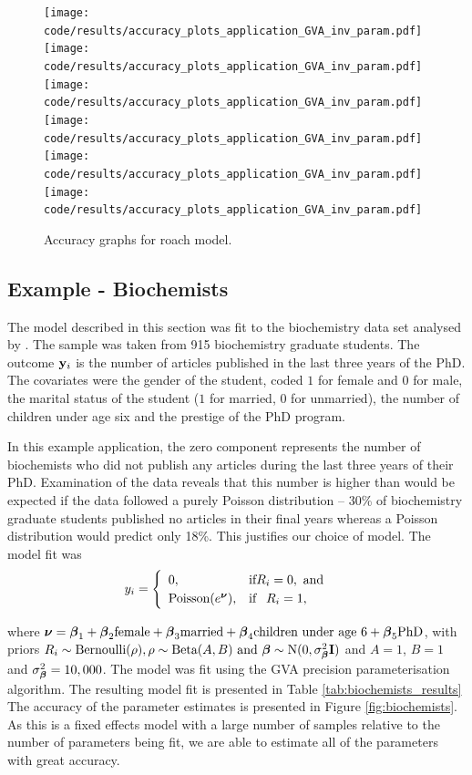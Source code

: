 \begin{figure}[h]
	\centering
	\texttt{[image: code/results/accuracy\_plots\_application\_GVA\_inv\_param.pdf]}
	\texttt{[image: code/results/accuracy\_plots\_application\_GVA\_inv\_param.pdf]}
	\texttt{[image: code/results/accuracy\_plots\_application\_GVA\_inv\_param.pdf]}
	\texttt{[image: code/results/accuracy\_plots\_application\_GVA\_inv\_param.pdf]}
	\texttt{[image: code/results/accuracy\_plots\_application\_GVA\_inv\_param.pdf]}
	\texttt{[image: code/results/accuracy\_plots\_application\_GVA\_inv\_param.pdf]}
	\caption{Accuracy graphs for roach model.}
	\label{fig:accuracy_roach}
\end{figure}
		
\subsection{Example - Biochemists}
\label{sec:biochemists}

The model described in this section was fit to the biochemistry data set
analysed by \cite{Long1990}. The sample was taken from 915 biochemistry
graduate students. The outcome ${\bf y}_i$ is the number of articles published in
the last three years of the PhD. The covariates were the gender of the student,
coded $1$ for female and $0$ for male, the marital status of the student ($1$
for married, $0$ for unmarried), the number of children under age six and the
prestige of the PhD program.

In this example application, the zero component represents the number of
biochemists who did not publish any articles during the last three years of
their PhD. Examination of the data reveals that this number is higher than
would be expected if the data followed a purely Poisson distribution -- 30\% of
biochemistry graduate students published no articles in their final years
whereas a Poisson distribution would predict only 18\%. This justifies our
choice of model. The model fit was
$$
	y_i = \begin{cases}
	\begin{array}{ll}
	0, & \text{if} R_i = 0, \text{ and }\\
	\text{Poisson}(e^{\boldsymbol \nu}), & \text{if} \phantom{-} R_i = 1,
	\end{array}
	\end{cases}
$$

\noindent where ${\boldsymbol \nu} = {\boldsymbol \beta}_1 + {\boldsymbol \beta}_2 \text{female} + {\boldsymbol \beta}_3
\text{married} + {\boldsymbol \beta}_4 \text{children under age 6} + {\boldsymbol \beta}_5 \text{PhD}$,
with priors
$R_i \sim \text{Bernoulli}(\rho), 
\rho \sim \text{Beta}(A, B) \text{ and } 
{\boldsymbol\beta} \sim \text{N}(0, \sigma_{{\boldsymbol \beta}}^2 {\bf I})$
and $A=1$, $B=1$ and $\sigma_{\boldsymbol \beta}^2 = 10,000$. The model was fit
using the GVA precision parameterisation algorithm. The resulting model fit is
presented in Table \ref{tab:biochemists_results} The accuracy of the parameter
estimates is presented in Figure \ref{fig:biochemists}. As this is a fixed
effects model with a large number of samples relative to the number of
parameters being fit, we are able to estimate all of the parameters with great
accuracy.

